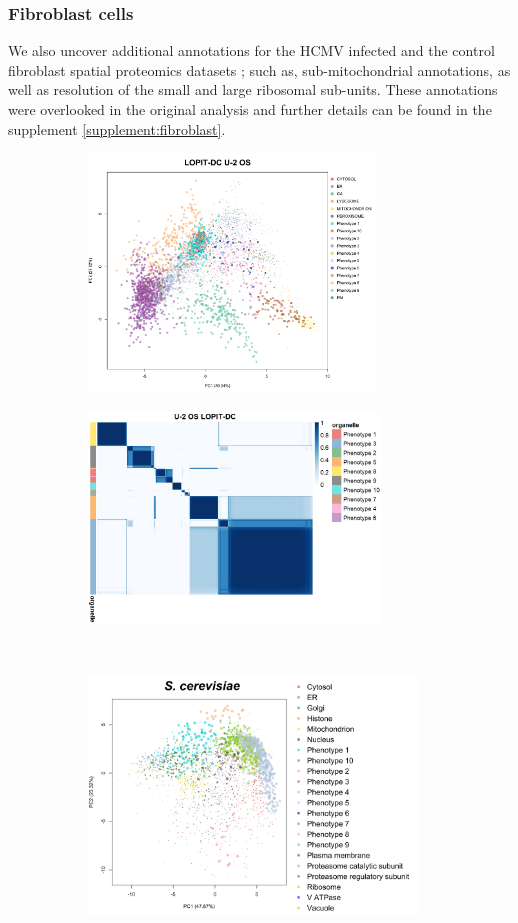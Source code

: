 \documentclass[12pt,english]{article}
\begin{document}
\subsubsection{Fibroblast cells}
We also uncover additional annotations for the HCMV infected and the control fibroblast spatial proteomics datasets \citep{Jean_Beltran:2016}; such as, sub-mitochondrial annotations, as well as resolution of the small and large ribosomal sub-units. These annotations were overlooked in the original analysis \citep{Jean_Beltran:2016} and further details can be found in the supplement \ref{supplement:fibroblast}.
 
\begin{figure}
	\begin{subfigure}[t]{0.5\textwidth}
	\centering
	\includegraphics[height=2.5in]{pcau2osdc.pdf}
	\caption{}
\end{subfigure}
\begin{subfigure}[t]{0.5\textwidth}
	\centering
	\includegraphics[height=2.2in]{heatmapU2osdc.jpeg}
	\caption{}
\end{subfigure}
~
\begin{subfigure}[t]{0.5\textwidth}
	\centering
	\includegraphics[height=2.5in]{pcaYeast.pdf}

\end{subfigure}
\end{figure}
\end{document}
